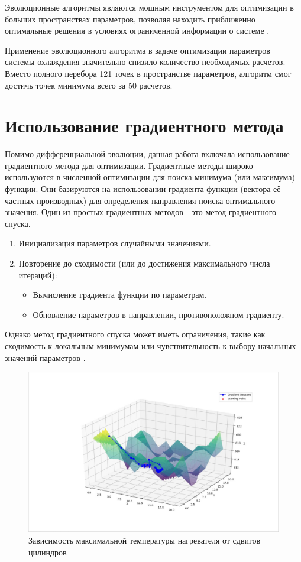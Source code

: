 \documentclass[a4paper,12pt]{article}
\theoremstyle{plain} %
\theoremstyle{definition} %
\theoremstyle{remark} %
\begin{document}
Эволюционные алгоритмы являются мощным инструментом для оптимизации в больших пространствах параметров, позволяя находить приближенно оптимальные решения в условиях ограниченной информации о системе \cite{evolution}.

Применение эволюционного алгоритма в задаче оптимизации параметров системы охлаждения значительно снизило количество необходимых расчетов. Вместо полного перебора 121 точек в пространстве параметров, алгоритм смог достичь точек минимума всего за 50 расчетов.

\section{Использование градиентного метода}

Помимо дифференциальной эволюции, данная работа включала использование градиентного метода для оптимизации. Градиентные методы широко используются в численной оптимизации для поиска минимума (или максимума) функции. Они базируются на использовании градиента функции (вектора её частных производных) для определения направления поиска оптимального значения. Один из простых градиентных методов - это метод градиентного спуска.

\begin{enumerate}
	\item Инициализация параметров случайными значениями.
	\item Повторение до сходимости (или до достижения максимального числа итераций):
	      \begin{itemize}
		      \item Вычисление градиента функции по параметрам.
		      \item Обновление параметров в направлении, противоположном градиенту.
	      \end{itemize}
\end{enumerate}

Однако метод градиентного спуска может иметь ограничения, такие как сходимость к локальным минимумам или чувствительность к выбору начальных значений параметров \cite{Chernyshev2007}.

\begin{figure}[h]
	\begin{center}
		\includegraphics[width=0.4\linewidth]{24.jpg}
		\caption{Зависимость максимальной температуры нагревателя от сдвигов цилиндров} %
	\end{center}
\end{figure}
\end{document}
